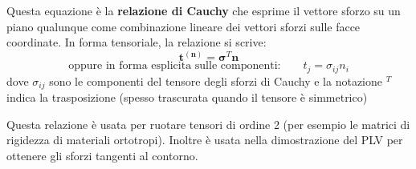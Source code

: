Questa equazione è la \textbf{relazione di Cauchy} che esprime il vettore sforzo su un piano qualunque come combinazione lineare dei vettori sforzi sulle facce coordinate.
In forma tensoriale, la relazione si scrive:
\begin{equation*}
\mathbf{t}^{(\mathbf{n})} = \mathbf{\sigma}^T \mathbf{n}
\end{equation*}
\begin{equation*}
\text{oppure in forma esplicita sulle componenti:}\qquad t_j = \sigma_{ij} n_i
\end{equation*}
dove $\sigma_{ij}$ sono le componenti del tensore degli sforzi di Cauchy e la notazione $^T$ indica la trasposizione (spesso trascurata quando il tensore è simmetrico)

Questa relazione è usata per ruotare tensori di ordine 2 (per esempio le matrici di rigidezza di materiali ortotropi). Inoltre è usata nella dimostrazione del PLV per ottenere gli sforzi tangenti al contorno.

